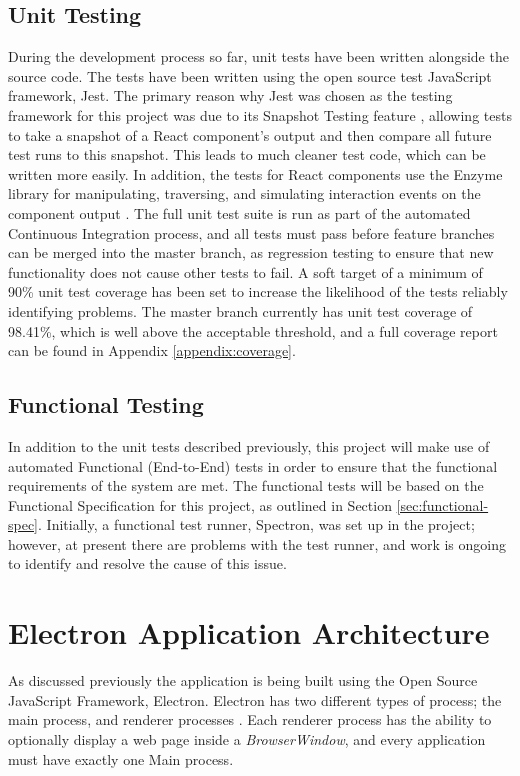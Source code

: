 \subsection{Unit Testing}
During the development process so far, unit tests have been written alongside the source code. The tests have been written using the open source test JavaScript framework, Jest. The primary reason why Jest was chosen as the testing framework for this project was due to its Snapshot Testing feature \cite{jest-snapshot}, allowing tests to take a snapshot of a React component's output and then compare all future test runs to this snapshot. This leads to much cleaner test code, which can be written more easily. In addition, the tests for React components use the Enzyme library for manipulating, traversing, and simulating interaction events on the component output \cite{enzyme}. The full unit test suite is run as part of the automated Continuous Integration process, and all tests must pass before feature branches can be merged into the master branch, as regression testing to ensure that new functionality does not cause other tests to fail. A soft target of a minimum of 90\% unit test coverage has been set to increase the likelihood of the tests reliably identifying problems. The master branch currently has unit test coverage of 98.41\%, which is well above the acceptable threshold, and a full coverage report can be found in Appendix \ref{appendix:coverage}.

\subsection{Functional Testing}
In addition to the unit tests described previously, this project will make use of automated Functional (End-to-End) tests in order to ensure that the functional requirements of the system are met. The functional tests will be based on the Functional Specification for this project, as outlined in Section \ref{sec:functional-spec}. Initially, a functional test runner, Spectron, was set up in the project; however, at present there are problems with the test runner, and work is ongoing to identify and resolve the cause of this issue.

\section{Electron Application Architecture}
As discussed previously the application is being built using the Open Source JavaScript Framework, Electron. Electron has two different types of process; the main process, and renderer processes \cite{electron-architecture}. Each renderer process has the ability to optionally display a web page inside a \textit{BrowserWindow}, and every application must have exactly one Main process. 

